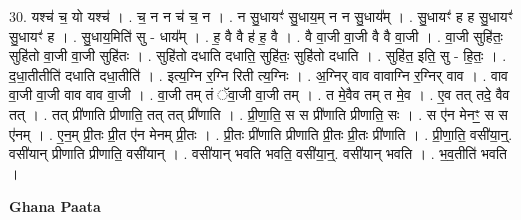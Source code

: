 \documentclass[17pt]{extarticle}
\begin{document}
30. यश्च॑ च॒ यो यश्च॑ । . च॒ न न च॑ च॒ न । . न सु॒धायꣳ॑ सु॒धाय॒म् न न सु॒धाय᳚म् । . सु॒धायꣳ॑ ह ह सु॒धायꣳ॑ सु॒धायꣳ॑ ह । . सु॒धाय॒मिति॑ सु - धाय᳚म् । . ह॒ वै वै ह॑ ह॒ वै । . वै वा॒जी वा॒जी वै वै वा॒जी । . वा॒जी सुहि॑तः॒ सुहि॑तो वा॒जी वा॒जी सुहि॑तः । . सुहि॑तो दधाति दधाति॒ सुहि॑तः॒ सुहि॑तो दधाति । . सुहि॑त॒ इति॒ सु - हि॒तः॒ । . द॒धा॒तीतीति॑ दधाति दधा॒तीति॑ । . इत्य॒ग्नि र॒ग्नि रिती त्य॒ग्निः । . अ॒ग्निर् वाव वावाग्नि र॒ग्निर् वाव । . वाव वा॒जी वा॒जी वाव वाव वा॒जी । . वा॒जी तम् तं ॅवा॒जी वा॒जी तम् । . त मे॒वैव तम् त मे॒व । . ए॒व तत् तदे॒ वैव तत् । . तत् प्री॑णाति प्रीणाति॒ तत् तत् प्री॑णाति । . प्री॒णा॒ति॒ स स प्री॑णाति प्रीणाति॒ सः । . स ए॑न मेनꣳ॒॒ स स ए॑नम् । . ए॒न॒म् प्री॒तः प्री॒त ए॑न मेनम् प्री॒तः । . प्री॒तः प्री॑णाति प्रीणाति प्री॒तः प्री॒तः प्री॑णाति । . प्री॒णा॒ति॒ वसी॑या॒न्॒. वसी॑यान् प्रीणाति प्रीणाति॒ वसी॑यान् । . वसी॑यान् भवति भवति॒ वसी॑या॒न्॒. वसी॑यान् भवति । . भ॒व॒तीति॑ भवति । \newline

\textbf{Ghana Paata } \newline
\end{document}
